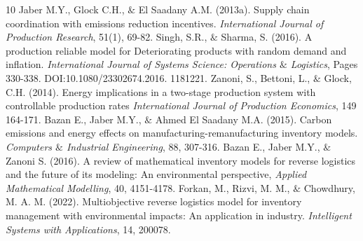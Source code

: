 \documentclass[11pt]{article}
\begin{document}
\begin{thebibliography}{10}
  {Jaber M.Y., Glock C.H., $\&$ El Saadany A.M.} (2013a). Supply chain coordination with emissions reduction incentives. {\it International Journal of Production Research}, 51(1), 69-82.
 {Singh, S.R., $\&$ Sharma, S.} (2016).  A production reliable model for Deteriorating products with random demand and inflation. {\it  International
 Journal of Systems Science: Operations $\&$ Logistics}, Pages 330-338.
 DOI:10.1080/23302674.2016. 1181221.
  {Zanoni, S., Bettoni, L., $\&$ Glock, C.H.} (2014).  Energy implications in a two-stage production system with controllable production rates {\it  International Journal of Production Economics}, 149  164-171.
   {Bazan E., Jaber M.Y., $\&$ Ahmed El Saadany M.A.} (2015). Carbon emissions and energy effects on manufacturing-remanufacturing inventory models. {\it Computers $\&$ Industrial Engineering}, 88, 307-316.
  {Bazan E., Jaber M.Y., $\&$ Zanoni S.} (2016).
 A review of mathematical inventory models for reverse logistics and the future of its modeling: An environmental perspective, {\it Applied Mathematical Modelling}, 40, 4151-4178. 
   {Forkan, M., Rizvi, M. M., $\&$ Chowdhury, M. A. M.} (2022). Multiobjective reverse logistics model for inventory management with environmental impacts: An application in industry. {\it Intelligent Systems with Applications}, 14, 200078.
  

\end{thebibliography}
\end{document}
